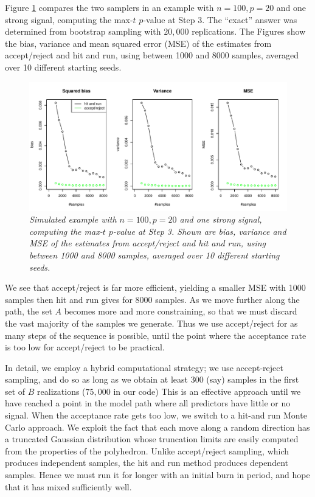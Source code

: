 \documentclass{article}
\begin{document}
\begin{appendix}
Figure \ref{fig:comparison} compares the two samplers in an example with $n=100, p=20$ and one strong signal, computing the max-$t$ $p$-value at Step 3.
The ``exact'' answer was determined from bootstrap sampling with $20,000$ replications.
The Figures show the bias, variance and mean squared error (MSE) of the estimates from accept/reject and hit and run, using between 1000 and 8000 samples, averaged
over 10 different starting seeds.
\begin{figure}[htp]
\centering
  \includegraphics[width=\textwidth]{figs/comparison.pdf}
  \caption{\em Simulated example with $n= 100, p=20$ and one strong signal, computing the max-$t$ $p$-value at Step 3.  Shown are bias, variance and MSE of the estimates from accept/reject and hit and run, using between 1000 and 8000 samples, averaged over 10 different starting seeds.
}
\label{fig:comparison}
\end{figure}
We see that accept/reject is far more efficient, yielding a smaller MSE with 1000 samples then hit and run gives for 8000 samples. As we move further along the path, the set $A$ becomes more and more constraining, so that we must discard the vast majority of the samples we generate. Thus we use accept/reject for as many steps of the sequence is possible,  until the point where the acceptance rate is too low for accept/reject to be practical.


In detail, we employ a hybrid computational strategy; we use accept-reject sampling, and do so as long as we obtain at least 300 (say) samples in the first set of $B$ realizations ($75,000$ in our code)  This is an effective approach until we have reached a point in the model path where all predictors have little or no signal. When the acceptance rate gets too low, we switch to a hit-and run Monte Carlo approach. We exploit the fact that each move along a random direction  has a truncated Gaussian distribution whose truncation limits are easily computed from the properties of the polyhedron. Unlike accept/reject sampling, which produces independent samples,  the hit and run method produces dependent samples. Hence we must run it for longer with an initial burn in period, and hope that it has mixed sufficiently well.


\end{appendix}
\end{document}
